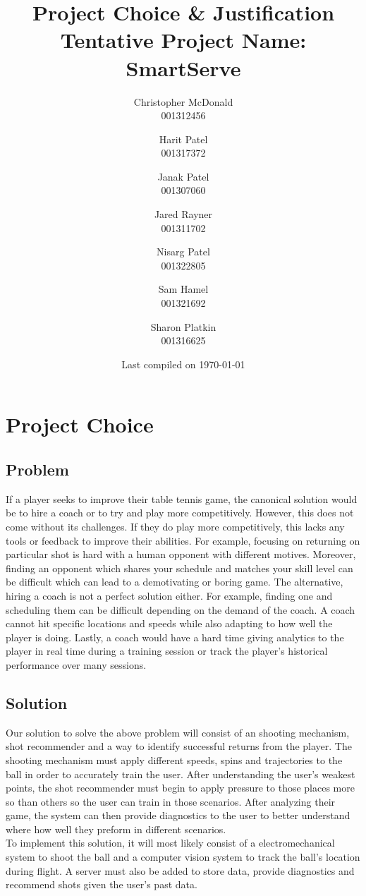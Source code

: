 \documentclass[11pt, oneside]{article}
\title{Project Choice \& Justification \\ Tentative Project Name: SmartServe}
\author{
Christopher McDonald \\ 001312456 \\ \and
Harit Patel \\ 001317372 \\ \and
Janak Patel \\ 001307060 \\ \and
Jared Rayner \\ 001311702 \\ \and
Nisarg Patel \\ 001322805 \\ \and
Sam Hamel \\ 001321692 \\ \and
Sharon Platkin \\ 001316625 \\
}
\date{Last compiled on \today}
\begin{document}
\maketitle
\section*{Project Choice}
\subsection*{Problem}
If a player seeks to improve their table tennis game, the canonical solution would be to hire a coach or to try and play more competitively. However, this does not come without its challenges. If they do play more competitively, this lacks any tools or feedback to improve their abilities. For example, focusing on returning on particular shot is hard with a human opponent with different motives. Moreover, finding an opponent which shares your schedule and matches your skill level can be difficult which can lead to a demotivating or boring game. The alternative, hiring a coach is not a perfect solution either. For example, finding one and scheduling them can be difficult depending on the demand of the coach. A coach cannot hit specific locations and speeds while also adapting to how well the player is doing. Lastly, a coach would have a hard time giving analytics to the player in real time during a training session or track the player's historical performance over many sessions.
\subsection*{Solution}
Our solution to solve the above problem will consist of an shooting mechanism, shot recommender and a way to identify successful returns from the player. The shooting mechanism must apply different speeds, spins and trajectories to the ball in order to accurately train the user. After understanding the user's weakest points, the shot recommender must begin to apply pressure to those places more so than others so the user can train in those scenarios. After analyzing their game, the system can then provide diagnostics to the user to better understand where how well they preform in different scenarios. \\
To implement this solution, it will most likely consist of a electromechanical system to shoot the ball and a computer vision system to track the ball's location during flight. A server must also be added to store data, provide diagnostics and recommend shots given the user's past data.
\end{document}
